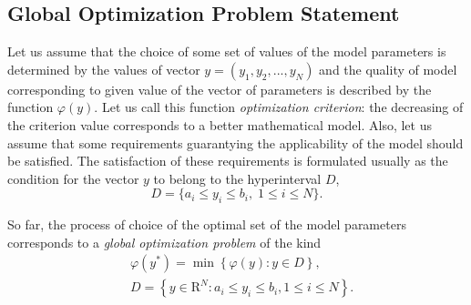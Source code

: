 \documentclass[sensors,article,submit,moreauthors,pdftex]{Definitions/mdpi}
\begin{document}











\subsection{Global Optimization Problem Statement}
Let us assume that the choice of some set of values of the model parameters is determined by the values of vector $y=(y_1,y_2,...,y_N)$ and the quality of model corresponding to given value of the vector of parameters is described by the function $\varphi(y)$. Let us call this function \textit{optimization criterion}: the decreasing of the criterion value corresponds to a better mathematical model. Also, let us assume that some requirements guarantying the applicability of the model should be satisfied. The satisfaction of these requirements is formulated usually as the condition for the vector $y$ to belong to the hyperinterval $D$,
\[
D=\{a_i \leq y_i \leq b_i, \; 1 \leq i \leq N\}.
\]

So far, the process of choice of the optimal set of the model parameters corresponds to a \textit{global optimization problem} of the kind
\begin{eqnarray}\label{main_problem}
& \varphi(y^\ast)=\min{\left\{\varphi(y):y\in D\right\}},\\
& D=\left\{y\in \text{R}^N: a_i\leq y_i \leq b_i, 1\leq i \leq N\right\}. \nonumber
\end{eqnarray}
\end{document}
